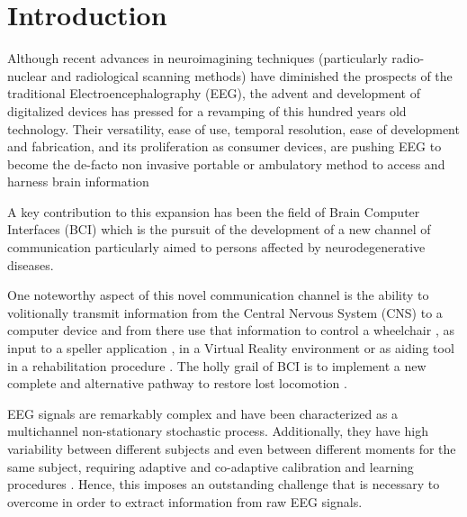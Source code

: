 \documentclass[entropy,article,submit,moreauthors,pdftex,10pt,a4paper]{mdpi}
\begin{document}

\setcounter{section}{-1} %

\section{Introduction}

Although recent advances in neuroimagining techniques (particularly radio-nuclear and radiological scanning methods) \citep{Schomer2010} have diminished the prospects of the traditional Electroencephalography (EEG), the advent and development of digitalized devices has pressed for a revamping of this hundred years old technology.  Their versatility, ease of use, temporal resolution, ease of development and fabrication, and its proliferation as consumer devices, are pushing EEG to become the de-facto non invasive portable or ambulatory method to access and harness brain information \cite{DeVos2014}

A key contribution to this expansion has been the field of Brain Computer Interfaces (BCI) \citep{WolpawJonathanR2012} which is the pursuit of the development of a new channel of communication particularly aimed to persons affected by neurodegenerative diseases.

One noteworthy aspect of this novel communication channel is the ability to volitionally transmit information from the Central Nervous System (CNS) to a computer device and from there use that information to control a wheelchair \citep{Carlson2013}, as input to a speller application \citep{Guger2009a}, in a Virtual Reality environment \citep{Lotte2013} or as aiding tool in a rehabilitation procedure \citep{Jure2016}.  The holly grail of BCI is to implement a new complete and alternative pathway to restore lost locomotion \citep{WolpawJonathanR2012}.

EEG signals are remarkably complex and have been characterized as a multichannel non-stationary stochastic process.  Additionally, they have high variability between different subjects and even between different moments for the same subject, requiring adaptive and co-adaptive calibration and learning procedures \citep{Clerc}.  Hence, this imposes an outstanding challenge that is necessary to overcome in order to extract information from raw EEG signals.
\end{document}
